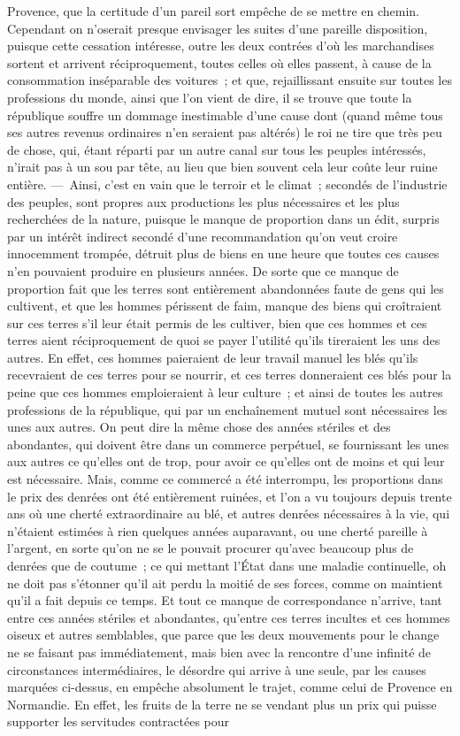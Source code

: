 \documentclass[french,twoside]{book} %
\begin{document}
Provence, que la certitude d’un pareil sort empêche de se mettre en chemin. Cependant on n’oserait presque envisager les suites d’une pareille disposition, puisque cette cessation intéresse, outre les deux contrées d’où les marchandises sortent et arrivent réciproquement, toutes celles où elles passent, à cause de la consommation inséparable des voitures ; et que, rejaillissant ensuite sur toutes les professions du monde, ainsi que l’on vient de dire, il se trouve que toute la république souffre un dommage inestimable d’une cause dont (quand même tous ses autres revenus ordinaires n’en seraient pas altérés) le roi ne tire que très peu de chose, qui, étant réparti par un autre canal sur tous les peuples intéressés, n’irait pas à un sou par tête, au lieu que bien souvent cela leur coûte leur ruine entière. — Ainsi, c’est en vain que le terroir et le climat ; secondés de l’industrie des peuples, sont propres aux productions les plus nécessaires et les plus recherchées de la nature, puisque le manque de proportion dans un édit, surpris par un intérêt indirect secondé d’une recommandation qu’on veut croire innocemment trompée, détruit plus de biens en une heure que toutes ces causes n’en pouvaient produire en plusieurs années. De sorte que ce manque de proportion fait que les terres sont entièrement abandonnées faute de gens qui les cultivent, et que les hommes périssent de faim, manque des biens qui croîtraient sur ces terres s’il leur était permis de les cultiver, bien que ces hommes et ces terres aient réciproquement de quoi se payer l’utilité qu’ils tireraient les uns des autres. En effet, ces hommes paieraient de leur travail manuel les blés qu’ils recevraient de ces terres pour se nourrir, et ces terres donneraient ces blés pour la peine que ces hommes emploieraient à leur culture ; et ainsi de toutes les autres professions de la république, qui par un enchaînement mutuel sont nécessaires les unes aux autres. On peut dire la même chose des années stériles et des abondantes, qui doivent être dans un commerce perpétuel, se fournissant les unes aux autres ce qu’elles ont de trop, pour avoir ce qu’elles ont de moins et qui leur est nécessaire. Mais, comme ce commercé a été interrompu, les proportions dans le prix des denrées ont été entièrement ruinées, et l’on a vu toujours depuis trente ans où une cherté extraordinaire au blé, et autres denrées nécessaires à la vie, qui n’étaient estimées à rien quelques années auparavant, ou une cherté pareille à l’argent, en sorte qu’on ne se le pouvait procurer qu’avec beaucoup plus de denrées que de coutume ; ce qui mettant l’État dans une maladie continuelle, oh ne doit pas s’étonner qu’il ait perdu la moitié de ses forces, comme on maintient qu’il a fait depuis ce temps. Et tout ce manque de correspondance n’arrive, tant entre ces années stériles et abondantes, qu’entre ces terres incultes et ces hommes oiseux et autres semblables, que parce que les deux mouvements pour le change ne se faisant pas immédiatement, mais bien avec la rencontre d’une infinité de circonstances intermédiaires, le désordre qui arrive à une seule, par les causes marquées ci-dessus, en empêche absolument le trajet, comme celui de Provence en Normandie. En effet, les fruits de la terre ne se vendant plus un prix qui puisse supporter les servitudes contractées pour 
\end{document}
